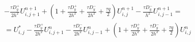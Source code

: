 \message{ !name(main.tex)}\documentclass[a4paper,12pt]{article}
\begin{document}
\begin{multline*}
  - \frac{\tau D^+_y }{2 h^2} U^{n+1}_{i,j+1} + \left(1 + \frac{\tau D^+_y}{2h^2} + \frac{\tau D^-_y}{2 h^2} + \frac{\tau q}{2} \right) U^{n+1}_{i,j} - \frac{\tau D^-_y}{h^2} U^{n+1}_{i,j-1} = \\
   = U_{i,j}^* - \frac{\tau D^+_y}{2 h^2} U^n_{i,j+1} - \frac{\tau D^-_y}{2 h^2} U^n_{i,j-1} + \left( 1 + \frac{\tau D^+_y}{2 h^2} + \frac{\tau D^-_y}{2 h^2} + \frac{\tau q}{2} \right) U^n_{i,j}
\end{multline*}
\end{document}
